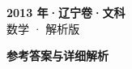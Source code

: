 \documentclass[zihao=-4, a4paper]{ctexart}
\begin{document}
\begin{center}
  {\Large\bfseries 2013 年·辽宁卷·文科}\\[4pt]
  {\large 数学 · 解析版}
\end{center}
\medskip
{}

\clearpage
{}
\begin{center}{\Large\bfseries 参考答案与详细解析}\end{center}
\medskip

\end{document}
